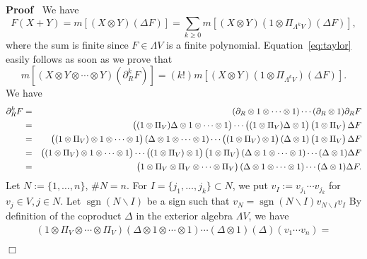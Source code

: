 \documentclass{article}
\newcommand{\assign}{:=}
\newcommand{\tmop}[1]{\ensuremath{\operatorname{#1}}}
\newenvironment{proof}{\noindent\textbf{Proof\ }}{\hspace*{\fill}$\Box$\medskip}
\begin{document}
\begin{proof}
  We have
  \[ F (X + Y) = m [(X \otimes Y) (\Delta F)] = \sum_{k \geqslant 0} m [(X
     \otimes Y) (1 \otimes \Pi_{\Lambda^k V}) (\Delta F)], \]
  where the sum is finite since $F \in \Lambda V$ is a finite polynomial.
  Equation~{\eqref{eq:taylor}} easily follows as soon as we prove that
  \[ m [(X \otimes Y \otimes \cdots \otimes Y) (\partial_R^k F)] = (k!) m [(X
     \otimes Y) (1 \otimes \Pi_{\Lambda^k V}) (\Delta F)] . \]
  We have
  \begin{eqnarray*}
    \partial^k_R F & = & (\partial_R \otimes 1 \otimes \cdots \otimes 1)
    \cdots (\partial_R \otimes 1) \partial_R F\\
    & = & \left( \vphantom{\tfrac{a}{b}} (1 \otimes \Pi_V) \Delta \otimes 1
    \otimes \cdots \otimes 1 \right) \cdots \left( \vphantom{\tfrac{a}{b}} (1
    \otimes \Pi_V) \Delta \otimes 1 \right) \left( \vphantom{\tfrac{a}{b}} 1
    \otimes \Pi_V \right) \Delta F\\
    & = & \left( \vphantom{\tfrac{a}{b}} (1 \otimes \Pi_V) \otimes 1 \otimes
    \cdots \otimes 1 \right) (\Delta \otimes 1 \otimes \cdots \otimes 1)
    \cdots \left( \vphantom{\tfrac{a}{b}} (1 \otimes \Pi_V) \otimes 1 \right)
    (\Delta \otimes 1) \left( \vphantom{\tfrac{a}{b}} 1 \otimes \Pi_V \right)
    \Delta F\\
    & = & \left( \vphantom{\tfrac{a}{b}} (1 \otimes \Pi_V) \otimes 1 \otimes
    \cdots \otimes 1 \right) \cdots \left( \vphantom{\tfrac{a}{b}} (1 \otimes
    \Pi_V) \otimes 1 \right) \left( \vphantom{\tfrac{a}{b}} 1 \otimes \Pi_V
    \right)  (\Delta \otimes 1 \otimes \cdots \otimes 1) \cdots (\Delta
    \otimes 1) \Delta F\\
    & = & \left( \vphantom{\tfrac{a}{b}} 1 \otimes \Pi_V \otimes \Pi_V
    \otimes \cdots \otimes \Pi_V \right)  (\Delta \otimes 1 \otimes \cdots
    \otimes 1) \cdots (\Delta \otimes 1) \Delta F.
  \end{eqnarray*}
  Let $N \assign \{ 1, \ldots, n \}$, $\#N = n$. For $I = \{ j_1, \ldots, j_k
  \} \subset N$, we put $v_I \assign v_{j_1} \cdots v_{j_k}$ for $v_j \in V, j
  \in N$. Let $\tmop{sgn} (N\backslash I)$ be a sign such that $v_N =
  \tmop{sgn} (N\backslash I) v_{N\backslash I} v_I$ By definition of the
  coproduct $\Delta$ in the exterior algebra $\Lambda V$, we have
  \[ \begin{array}{c}
       (1 \otimes \Pi_V \otimes \cdots \otimes \Pi_V) (\Delta \otimes 1
       \otimes \cdots \otimes 1) \cdots (\Delta \otimes 1) (\Delta) (v_1
       \cdots v_n) =\\

\end{array}\]
\end{proof}
\end{document}
